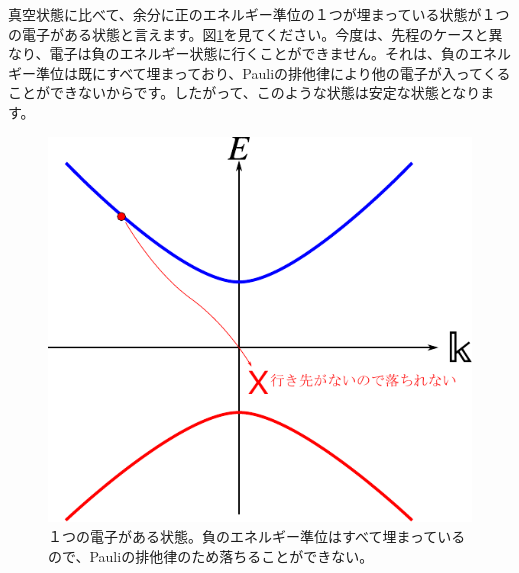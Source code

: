 \documentclass[report,paper=a4, fontsize=12pt, line_length=16cm, number_of_lines=33,dvipdfmx]{jlreq}
\numberwithin{equation}{chapter}
\begin{document}
真空状態に比べて、余分に正のエネルギー準位の１つが埋まっている状態が１つの電子がある状態と言えます。図\ref{fig:oneparticle}を見てください。今度は、先程のケースと異なり、電子は負のエネルギー状態に行くことができません。それは、負のエネルギー準位は既にすべて埋まっており、Pauliの排他律により他の電子が入ってくることができないからです。したがって、このような状態は安定な状態となります。
\begin{figure}[htbp]
  \centering
  \includegraphics{oneparticle.pdf}
  \caption{１つの電子がある状態。負のエネルギー準位はすべて埋まっているので、Pauliの排他律のため落ちることができない。}
  \label{fig:oneparticle}
\end{figure}
\end{document}
